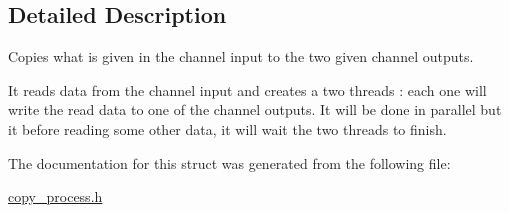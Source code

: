 \subsection{Detailed Description}
Copies what is given in the channel input to the two given channel outputs. 

It reads data from the channel input and creates a two threads \-: each one will write the read data to one of the channel outputs. It will be done in parallel but it before reading some other data, it will wait the two threads to finish. 

The documentation for this struct was generated from the following file\-:\begin{DoxyCompactItemize}
\item 
\hyperlink{copy__process_8h}{copy\-\_\-process.\-h}\end{DoxyCompactItemize}
